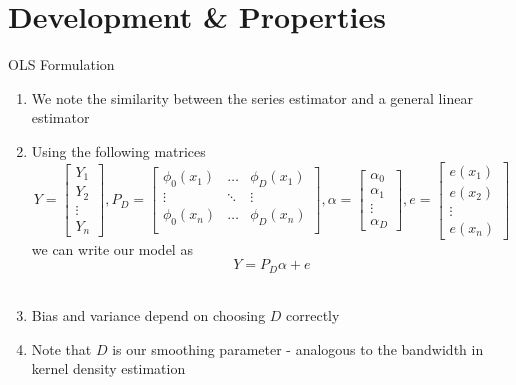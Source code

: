 \documentclass{beamer}
\begin{document}

\section{Development \& Properties}
\begin{frame}{OLS Formulation}%
\begin{enumerate}
\item We note the similarity between the series estimator and a general linear estimator\pause 
\item Using the following matrices
$$Y = \begin{bmatrix}Y_1\\ Y_2\\\vdots\\Y_n\end{bmatrix}, P_D = \begin{bmatrix}\phi_0(x_1) & \ldots & \phi_{D}(x_1)\\\vdots & \ddots & \vdots \\\phi_0(x_n) & \ldots & \phi_{D}(x_n)\\\end{bmatrix}, \alpha = \begin{bmatrix}\alpha_0\\\alpha_1 \\\vdots\\\alpha_D\end{bmatrix}, e =\begin{bmatrix}e(x_1)\\e(x_2)\\\vdots\\e(x_n)\end{bmatrix}$$
we can write our model as $$Y = P_D\alpha + e$$\\
\item Bias and variance depend on choosing $D$ correctly
\item Note that $D$ is our smoothing parameter - analogous to the bandwidth in kernel density estimation 
\end{enumerate}
\end{frame}
\end{document}
